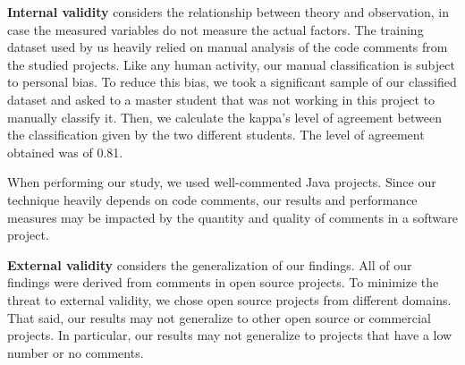 \noindent\textbf{Internal validity} considers the relationship between theory and observation, in case the measured variables do not measure the actual factors. The training dataset used by us heavily relied on manual analysis of the code comments from the studied projects. Like any human activity, our manual classification is subject to personal bias. To reduce this bias, we took a significant sample of our classified dataset and asked to a master student that was not working in this project to manually classify it. Then, we calculate the kappa's level of agreement between the classification given by the two different students. The level of agreement obtained was of 0.81.  

When performing our study, we used well-commented Java projects. Since our technique heavily depends on code comments, our results and performance measures may be impacted by the quantity and quality of comments in a software project.  

\noindent \textbf{External validity} considers the generalization of our findings. All of our findings were derived from comments in open source projects. To minimize the threat to external validity, we chose open source projects from different domains. That said, our results may not generalize to other open source or commercial projects. In particular, our results may not generalize to projects that have a low number or no comments.
